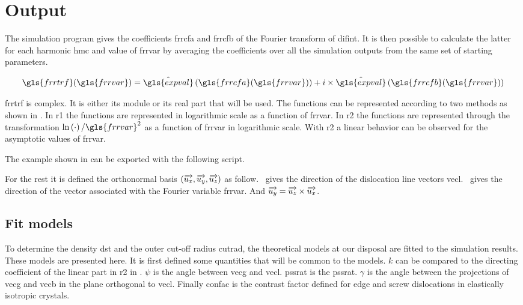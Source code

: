 \section{Output}

The simulation program gives the coefficients \gls{frrcfa} and \gls{frrcfb} of the Fourier transform of \gls{difint}.
It is then possible to calculate the latter for each harmonic \gls{hmc} and value of \gls{frrvar} by averaging the coefficients over all the simulation outputs from the same set of starting parameters.

\begin{equation}\label{eq:fourier-amplitude}
  \gls{frrtrf}(\gls{frrvar}) =
    \hat{\gls{expval}} \left( \gls{frrcfa}(\gls{frrvar}) \right) + i \times \hat{\gls{expval}} \left( \gls{frrcfb}(\gls{frrvar}) \right)
\end{equation}

\medskip

\gls{frrtrf} is complex.
It is either its module or its real part that will be used.
The functions can be represented according to two methods as shown in .
In \gls{r1} the functions are represented in logarithmic scale as a function of \gls{frrvar}.
In \gls{r2} the functions are represented through the transformation \( \ln\left( \cdot \right) / \gls{frrvar}^2 \) as a function of \gls{frrvar} in logarithmic scale.
With \gls{r2} a linear behavior can be observed for the asymptotic values of \gls{frrvar}.


The example shown in  can be exported with the following script.


\bigskip

For the rest it is defined the orthonormal basis \( \left( \overrightarrow{u_x}, \overrightarrow{u_y}, \overrightarrow{u_z} \right) \) as follow.
\uz \ gives the direction of the dislocation line vectors \gls{vecl}.
\ux \ gives the direction of the vector associated with the Fourier variable \gls{frrvar}.
And \( \overrightarrow{u_y} = \overrightarrow{u_z} \times \overrightarrow{u_x} \).

\subsection{Fit models}

To determine the density \gls{dst} and the outer cut-off radius \gls{cutrad}, the theoretical models at our disposal are fitted to the simulation results.
These models are presented here.
It is first defined some quantities that will be common to the models.
\( k \) can be compared to the directing coefficient of the linear part in \gls{r2} in .
\( \psi \) is the angle between \gls{vecg} and \gls{vecl}.
\gls{pssrat} is the \glsdesc{pssrat}.
\( \gamma \) is the angle between the projections of \gls{vecg} and \gls{vecb} in the plane orthogonal to \gls{vecl}.
Finally \gls{confac} is the contrast factor defined for edge and screw dislocations in elastically isotropic crystals.

